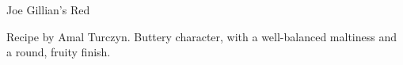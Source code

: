 \begin{recipe}{Joe Gillian's Red} %

\begin{aboutblock}
Recipe by Amal Turczyn. Buttery character, with a well-balanced maltiness and
a round, fruity finish. \sourceaha
\end{aboutblock}


\begin{methodandtiming}
 
\begin{mashsteps}
\end{mashsteps}

\begin{fermentationsteps}
\end{fermentationsteps}

\end{methodandtiming}

\recipebreak

\begin{ingredientsblock}

\begin{malts}
\end{malts}

\begin{hops}
\end{hops}


\end{ingredientsblock}

\end{recipe}

